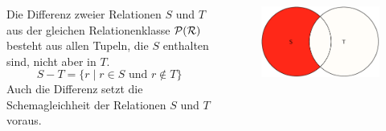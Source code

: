\begin{frame}\frametitle{\insertsection}
\framesubtitle{\insertsubsection}
\vspace{5mm}
\begin{columns}
	\begin{column}{.58\textwidth}
		Die Differenz zweier Relationen $S$ und $T$ aus der gleichen Relationenklasse $\mathcal{P}(\mathcal{R})$
		besteht aus allen Tupeln, die $S$ enthalten sind,	nicht aber in $T$.
		\begin{equation*}
		S-T=\{r\mid r\in S \text{\ und\ } r \notin T\}
		\end{equation*}
		Auch die Differenz setzt die Schemagleichheit der Relationen $S$ und $T$ voraus.
	\end{column}
	\begin{column}{.33\textwidth}
		\begin{figure}[t]
			\includegraphics[scale=0.4]{img/difference.pdf}
		\end{figure}
	\end{column}
\end{columns}
\end{frame}

